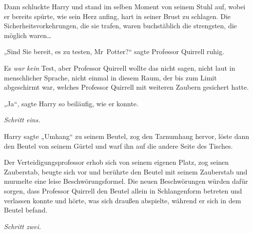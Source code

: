 Dann schluckte Harry und stand im selben Moment von seinem Stuhl auf, wobei er bereits spürte, wie sein Herz anfing, hart in seiner Brust zu schlagen. Die Sicherheitsvorkehrungen, die sie trafen, waren buchstäblich die strengsten, die möglich waren…

„Sind Sie bereit, es zu testen, Mr~Potter?“ sagte Professor Quirrell ruhig.

Es \emph{war kein} Test, aber Professor Quirrell wollte das nicht sagen, nicht laut in menschlicher Sprache, nicht einmal in diesem Raum, der bis zum Limit abgeschirmt war, welches Professor Quirrell mit weiteren Zaubern gesichert hatte.

„Ja“, sagte Harry so beiläufig, wie er konnte.

\emph{Schritt eins.}

Harry sagte
„Umhang“ zu seinem Beutel, zog den Tarnumhang hervor, löste dann den Beutel von seinem Gürtel und warf ihn auf die andere Seite des Tisches.

Der Verteidigungsprofessor erhob sich von seinem eigenen Platz, zog seinen Zauberstab, beugte sich vor und berührte den Beutel mit seinem Zauberstab und murmelte eine leise Beschwörungsformel. Die neuen Beschwörungen würden dafür sorgen, dass Professor Quirrell den Beutel allein in Schlangenform betreten und verlassen konnte und hörte, was sich draußen abspielte, während er sich in dem Beutel befand.

\emph{Schritt zwei.}

